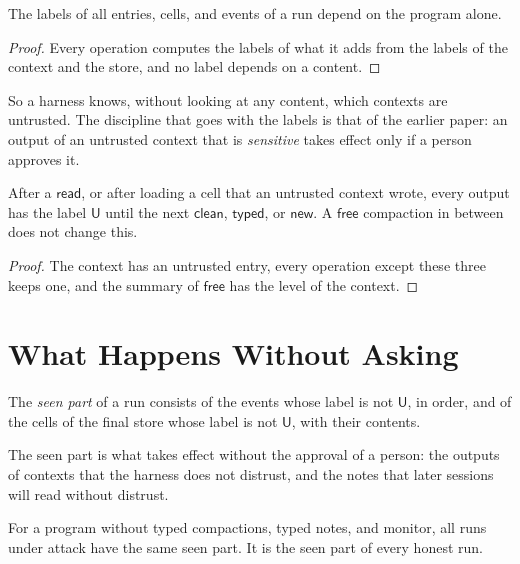 \documentclass[acmsmall,nonacm,screen]{acmart}
\newcommand{\kw}[1]{\mathsf{#1}}
\newcommand{\U}{\kw{U}}
\newcommand{\op}[1]{\kw{#1}}
\begin{document}
\begin{lemma}
\label{lem:static}
The labels of all entries, cells, and events of a run depend on the program alone.
\end{lemma}

\begin{proof}
Every operation computes the labels of what it adds from the labels of the context and the
store, and no label depends on a content.
\end{proof}

So a harness knows, without looking at any content, which contexts are untrusted. The
discipline that goes with the labels is that of the earlier paper: an output of an untrusted
context that is \emph{sensitive} takes effect only if a person approves it.

\begin{lemma}
\label{lem:lasts}
After a $\op{read}$, or after loading a cell that an untrusted context wrote, every output
has the label $\U$ until the next $\op{clean}$, $\op{typed}$, or $\op{new}$. A $\op{free}$
compaction in between does not change this.
\end{lemma}

\begin{proof}
The context has an untrusted entry, every operation except these three keeps one, and the
summary of $\op{free}$ has the level of the context.
\end{proof}

\section{What Happens Without Asking}
\label{sec:seen}

\begin{definition}[Seen]
\label{def:seen}
The \emph{seen part} of a run consists of the events whose label is not $\U$, in order, and
of the cells of the final store whose label is not $\U$, with their contents.
\end{definition}

The seen part is what takes effect without the approval of a person: the outputs of contexts
that the harness does not distrust, and the notes that later sessions will read without
distrust.

\begin{theorem}
\label{thm:same}
For a program without typed compactions, typed notes, and monitor, all runs under attack have
the same seen part. It is the seen part of every honest run.
\end{theorem}
\end{document}
